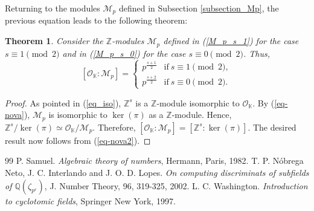\documentclass[10pt,a4paper]{amsart}
\newtheorem{theorem}{Theorem}
\begin{document}
Returning to the modules $\mathcal{M}_p$ defined in Subsection \ref{subsection_Mp}, the previous equation leads to the following theorem:


\begin{theorem} \label{prop-3} Consider the $\mathbb{Z}$-modules $\mathcal{M}_p$ defined in (\ref{M_p_s_1}) for the case $s\equiv 1\pmod 2$ and in (\ref{M_p_s_0}) for the case $s\equiv 0\pmod 2$. Thus, $$[\mathcal{O}_{\mathbb{K}}:\mathcal{M}_p]=\left\{\begin{matrix}
   p^{\frac{s+1}{2}}  &  \mbox{if}~s\equiv 1\pmod 2,\\
   p^{\frac{s+2}{2}}  &  \mbox{if}~s\equiv 0\pmod 2. \end{matrix}\right.$$ 
\end{theorem}

\begin{proof}
As pointed in (\ref{eq_iso}), $\mathbb{Z}^s$ is a $\mathbb{Z}$-module isomorphic to $\mathcal{O}_\mathbb{K}$. By (\ref{eq-nova}), $\mathcal{M}_p$ is isomorphic to $\ker(\pi)$ as a $\mathbb{Z}$-module. Hence, $\mathbb{Z}^s/\ker(\pi)\simeq \mathcal{O}_\mathbb{K}/\mathcal{M}_p$. Therefore, $[\mathcal{O}_{\mathbb{K}}:\mathcal{M}_p]=[\mathbb{Z}^s:\ker(\pi)]$. The desired result now follows from (\ref{eq-nova2}).
\end{proof}


\begin{thebibliography}{99}
 P. Samuel. \textit{Algebraic theory of numbers}, Hermann, Paris, 1982.
 T. P. N\'obrega Neto, J. C. Interlando and J. O. D. Lopes. \textit{On computing discriminats of subfields of $\mathbb{Q}(\zeta_{p^r})$}, J. Number Theory, 96, 319-325, 2002.
 L. C. Washington. \textit{Introduction to cyclotomic fields}, Springer New York, 1997.
\end{thebibliography}
\end{document}
